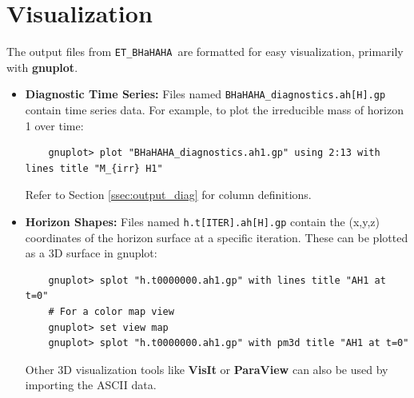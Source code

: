 \documentclass[a4paper,11pt]{article}
\newcommand{\thorn}[1]{{\tt #1}}
\newcommand{\program}[1]{{\bf #1}}
\newcommand{\file}[1]{{\tt #1}}
\newcommand{\BHaHAHA}{\thorn{ET\_BHaHAHA}} %
\begin{document}
\section{Visualization}
\label{sec:visualization}
The output files from \BHaHAHA\ are formatted for easy visualization, primarily with \program{gnuplot}.
\begin{itemize}
    \item \textbf{Diagnostic Time Series:} Files named \file{BHaHAHA\_diagnostics.ah[H].gp} contain time series data. For example, to plot the irreducible mass of horizon 1 over time:
    \begin{verbatim}
    gnuplot> plot "BHaHAHA_diagnostics.ah1.gp" using 2:13 with lines title "M_{irr} H1"
    \end{verbatim}
    Refer to Section \ref{ssec:output_diag} for column definitions.
    \item \textbf{Horizon Shapes:} Files named \file{h.t[ITER].ah[H].gp} contain the (x,y,z) coordinates of the horizon surface at a specific iteration. These can be plotted as a 3D surface in gnuplot:
    \begin{verbatim}
    gnuplot> splot "h.t0000000.ah1.gp" with lines title "AH1 at t=0"
    # For a color map view
    gnuplot> set view map
    gnuplot> splot "h.t0000000.ah1.gp" with pm3d title "AH1 at t=0"
    \end{verbatim}
    Other 3D visualization tools like \program{VisIt} or \program{ParaView} can also be used by importing the ASCII data.
\end{itemize}
\end{document}
